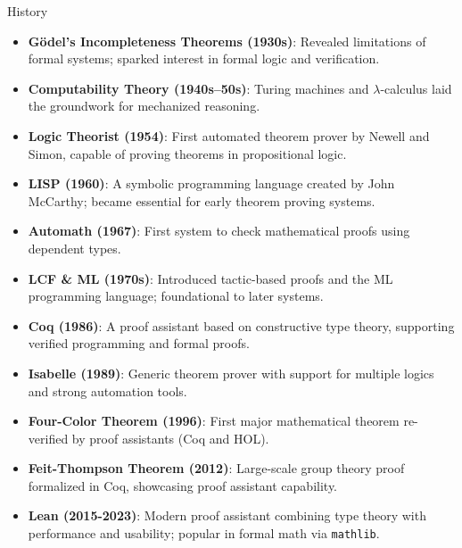 \documentclass{beamer}
\begin{document}
\begin{frame}{History}
\begin{itemize}
  \item \textbf{Gödel’s Incompleteness Theorems (1930s)}: Revealed limitations of formal systems; sparked interest in formal logic and verification.

  \item \textbf{ Computability Theory (1940s–50s)}: Turing machines and $\lambda$-calculus laid the groundwork for mechanized reasoning.
\item \textbf{Logic Theorist (1954)}: First automated theorem prover by Newell and Simon, capable of proving theorems in propositional logic.

  \item \textbf{LISP (1960)}: A symbolic programming language created by John McCarthy; became essential for early theorem proving systems.

   \item \textbf{Automath (1967)}: First system to check mathematical proofs using dependent types.
 
  
\end{itemize}
\end{frame} 
\begin{frame}

\begin{itemize}
   \item \textbf{LCF \& ML (1970s)}: Introduced tactic-based proofs and the ML programming language; foundational to later systems.
  
  \item \textbf{Coq (1986)}: A proof assistant based on constructive type theory, supporting verified programming and formal proofs.
  
  \item \textbf{Isabelle (1989)}: Generic theorem prover with support for multiple logics and strong automation tools.

  \item \textbf{Four-Color Theorem (1996)}: First major mathematical theorem re-verified by proof assistants (Coq and HOL).
  
  \item \textbf{Feit-Thompson Theorem (2012)}: Large-scale group theory proof formalized in Coq, showcasing proof assistant capability.
  
  \item \textbf{Lean (2015-2023)}: Modern proof assistant combining type theory with performance and usability; popular in formal math via \texttt{mathlib}.
  
\end{itemize}
\end{frame}
\end{document}
